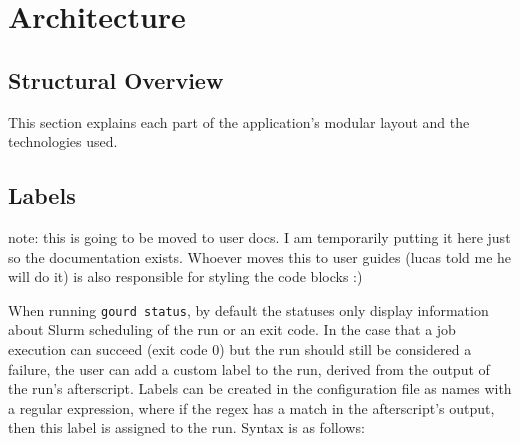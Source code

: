 \pagebreak


\section{Architecture}\label{sec:architecture}

\subsection{Structural Overview}

This section explains each part of the application's modular layout and the technologies used.

\subsection{Labels}
note: this is going to be moved to user docs.
I am temporarily putting it here just so the documentation exists.
Whoever moves this to user guides (lucas told me he will do it) is also responsible for styling the code blocks :)

When running \verb|gourd status|, by default the statuses only display information about Slurm scheduling of the run or an exit code.
In the case that a job execution can succeed (exit code 0) but the run should still be considered a failure, the user can add a custom label to the run, derived from the output of the run's afterscript.
Labels can be created in the configuration file as names with a regular expression, where if the regex has a match in the afterscript's output, then this label is assigned to the run.
Syntax is as follows:

